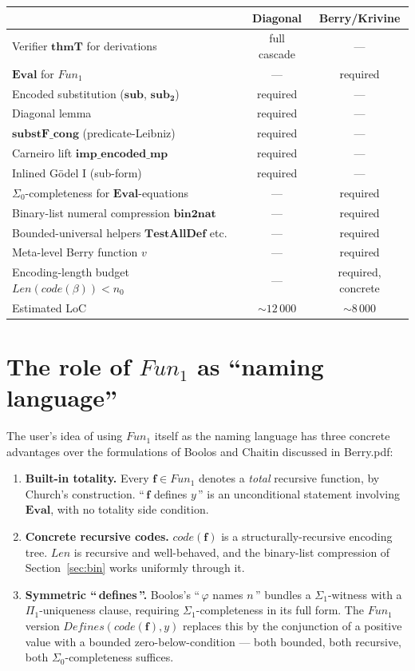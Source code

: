 \documentclass[11pt]{article}
\theoremstyle{plain}
\theoremstyle{definition}
\theoremstyle{remark}
\newcommand{\code}[1]{\mathit{code}(#1)}
\newcommand{\Fun}{\mathit{Fun}}
\newcommand{\Defines}{\mathit{Defines}}
\newcommand{\Len}{\mathit{Len}}
\newcommand{\Eval}{\mathbf{Eval}}
\newcommand{\bnt}{\mathbf{bin2nat}}
\begin{document}
\begin{center}
\begin{tabular}{p{6cm} c c}
\hline
& Diagonal & Berry/Krivine \\
\hline
Verifier $\mathbf{thmT}$ for derivations & full cascade & --- \\
$\Eval$ for $\Fun_1$ & --- & required \\
Encoded substitution ($\mathbf{sub}$, $\mathbf{sub_2}$) & required & --- \\
Diagonal lemma & required & --- \\
$\mathbf{substF\_cong}$ (predicate-Leibniz) & required & --- \\
Carneiro lift $\mathbf{imp\_encoded\_mp}$ & required & --- \\
Inlined G\"odel I (sub-form) & required & --- \\
$\Sigma_0$-completeness for $\Eval$-equations & --- & required \\
Binary-list numeral compression $\bnt$ & --- & required \\
Bounded-universal helpers $\mathbf{TestAllDef}$ etc. & --- & required \\
Meta-level Berry function $v$ & --- & required \\
Encoding-length budget $\Len(\code{\beta}) < n_0$ & --- & required, concrete \\
\hline
Estimated LoC & $\sim 12\,000$ & $\sim 8\,000$ \\
\hline
\end{tabular}
\end{center}

\section{The role of $\Fun_1$ as ``naming language''}

The user's idea of using $\Fun_1$ itself as the naming language has
three concrete advantages over the formulations of Boolos and Chaitin
discussed in Berry.pdf:

\begin{enumerate}
\item \textbf{Built-in totality.}  Every $\mathbf{f} \in \Fun_1$
denotes a \emph{total} recursive function, by Church's construction.
``\,$\mathbf{f}$ defines $y$\,'' is an unconditional statement
involving $\Eval$, with no totality side condition.

\item \textbf{Concrete recursive codes.}  $\code{\mathbf{f}}$ is a
structurally-recursive encoding tree.  $\Len$ is recursive and
well-behaved, and the binary-list compression of
Section~\ref{sec:bin} works uniformly through it.

\item \textbf{Symmetric ``\,defines\,''.}  Boolos's ``\,$\varphi$
names $n$\,'' bundles a $\Sigma_1$-witness with a $\Pi_1$-uniqueness
clause, requiring $\Sigma_1$-completeness in its full form.  The
$\Fun_1$ version $\Defines(\code{\mathbf{f}}, y)$ replaces this by the
conjunction of a positive value with a bounded
zero-below-condition --- both bounded, both recursive, both
$\Sigma_0$-completeness suffices.
\end{enumerate}
\end{document}
